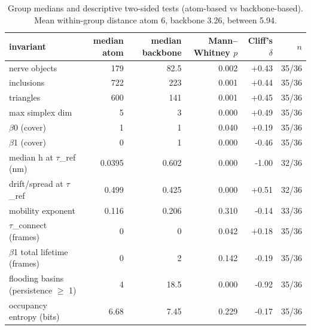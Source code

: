 \begin{table}[H]\centering\small\begin{tabular}{lrrrrr}\toprule
invariant & median atom & median backbone & Mann--Whitney $p$ & Cliff's $\delta$ & $n$\\\midrule
nerve objects & 179 & 82.5 & 0.002 & +0.43 & 35/36\\
inclusions & 722 & 223 & 0.001 & +0.44 & 35/36\\
triangles & 600 & 141 & 0.001 & +0.45 & 35/36\\
max simplex dim & 5 & 3 & 0.000 & +0.49 & 35/36\\
$\beta$0 (cover) & 1 & 1 & 0.040 & +0.19 & 35/36\\
$\beta$1 (cover) & 0 & 1 & 0.000 & -0.46 & 35/36\\
median h at $\tau$\_ref (nm) & 0.0395 & 0.602 & 0.000 & -1.00 & 32/36\\
drift/spread at $\tau$\_ref & 0.499 & 0.425 & 0.000 & +0.51 & 32/36\\
mobility exponent & 0.116 & 0.206 & 0.310 & -0.14 & 33/36\\
$\tau$\_connect (frames) & 0 & 0 & 0.042 & +0.18 & 35/36\\
$\beta$1 total lifetime (frames) & 0 & 2 & 0.142 & -0.19 & 35/36\\
flooding basins (persistence $\ge$ 1) & 4 & 18.5 & 0.000 & -0.92 & 35/36\\
occupancy entropy (bits) & 6.68 & 7.45 & 0.229 & -0.17 & 35/36\\
\bottomrule\end{tabular}\caption{Group medians and descriptive two-sided tests (atom-based vs backbone-based). Mean within-group distance atom 6, backbone 3.26, between 5.94.}\label{tab:groups}\end{table}
